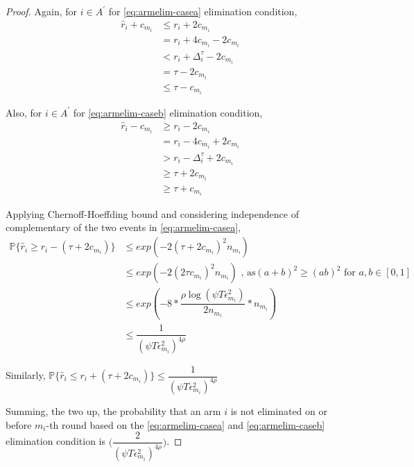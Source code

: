 \begin{proof}
Again, for ${i} \in A^{'}$ for \ref{eq:armelim-casea} elimination condition, 
\begin{align*}
\hat{r}_{i} + c_{m_{i}}&\leq r_{i} + 2c_{m_{i}} \\
&= r_{i} + 4c_{m_{i}} - 2c_{m_{i}} \\
&< r_{i} + \Delta_{i}^{\tau} - 2c_{m_{i}}\\
&= \tau -2c_{m_{i}} \\
&\leq \tau - c_{m_{i}}
\end{align*}

Also, for ${i} \in A^{'}$ for \ref{eq:armelim-caseb} elimination condition, 
\begin{align*}
\hat{r}_{i} - c_{m_{i}}&\geq r_{i} - 2c_{m_{i}} \\
&= r_{i} - 4c_{m_{i}} + 2c_{m_{i}} \\
&> r_{i} - \Delta_{i}^{\tau} + 2c_{m_{i}}\\
&\geq \tau + 2c_{m_{i}} \\
&\geq \tau + c_{m_{i}}
\end{align*}

Applying Chernoff-Hoeffding bound and considering independence of complementary of the two events in \ref{eq:armelim-casea},
  \begin{align*}
\mathbb{P}\lbrace\hat{r}_{i}\geq r_{i} - (\tau + 2c_{m_{i}})\rbrace &\leq exp(-2(\tau + 2c_{m_{i}})^{2}n_{m_{i}})\\
&\leq exp(-2(2\tau c_{m_{i}})^{2}n_{m_{i}}) \text{ , as} (a+b)^{2} \geq (ab)^{2} \text{ for } a,b\in[0,1]\\
&\leq exp(-8 * \dfrac{\rho\log (\psi T\epsilon_{m_{i}}^{2})}{2 n_{m_{i}}} *n_{m_{i}})\\
&\leq \dfrac{1}{(\psi T\epsilon_{m_{i}}^{2})^{4\rho}}   
  \end{align*}
  
Similarly, $\mathbb{P}\lbrace\hat{r}_{i}\leq r_{i} + (\tau + 2c_{m_{i}})\rbrace\leq \dfrac{1}{(\psi  T\epsilon_{m_{i}}^{2})^{4\rho}}$
 
Summing, the two up, the probability that an arm ${i}$ is not eliminated on or before $m_{i}$-th round based on the \ref{eq:armelim-casea} and \ref{eq:armelim-caseb} elimination condition is  $\bigg(\dfrac{2}{(\psi T\epsilon_{m_{i}}^{2})^{4\rho}}\bigg)$. 

%


\end{proof}
